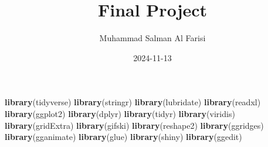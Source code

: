 \documentclass[
]{article}
\title{Final Project}
\author{Muhammad Salman Al Farisi}
\date{2024-11-13}
\newenvironment{Shaded}{\begin{snugshade}}{\end{snugshade}}
\newcommand{\FunctionTok}[1]{\textcolor[rgb]{0.13,0.29,0.53}{\textbf{#1}}}
\newcommand{\NormalTok}[1]{#1}
\newcommand{\OtherTok}[1]{\textcolor[rgb]{0.56,0.35,0.01}{#1}}
\newcommand{\SpecialCharTok}[1]{\textcolor[rgb]{0.81,0.36,0.00}{\textbf{#1}}}
\newcommand{\StringTok}[1]{\textcolor[rgb]{0.31,0.60,0.02}{#1}}
\begin{document}
\maketitle

\begin{Shaded}
\begin{Highlighting}[]
\FunctionTok{library}\NormalTok{(tidyverse)}
\FunctionTok{library}\NormalTok{(stringr)}
\FunctionTok{library}\NormalTok{(lubridate)}
\FunctionTok{library}\NormalTok{(readxl)}
\FunctionTok{library}\NormalTok{(ggplot2)}
\FunctionTok{library}\NormalTok{(dplyr)}
\FunctionTok{library}\NormalTok{(tidyr)}
\FunctionTok{library}\NormalTok{(viridis)}
\FunctionTok{library}\NormalTok{(gridExtra) }
\FunctionTok{library}\NormalTok{(gifski)}
\FunctionTok{library}\NormalTok{(reshape2)}
\FunctionTok{library}\NormalTok{(ggridges)}
\FunctionTok{library}\NormalTok{(gganimate)}
\FunctionTok{library}\NormalTok{(glue)}
\FunctionTok{library}\NormalTok{(shiny)}
\FunctionTok{library}\NormalTok{(ggedit)}
\end{Highlighting}
\end{Shaded}

\begin{Shaded}
\end{Shaded}
\end{document}
